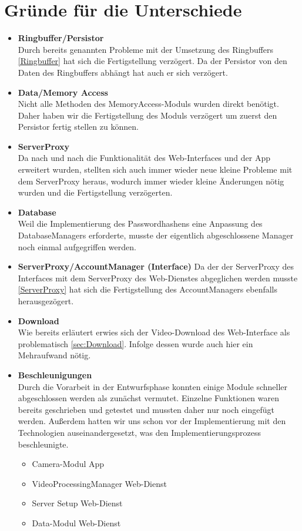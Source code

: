 \section{Gründe für die Unterschiede} \label{sec:PlanDiff}
\begin{itemize}

\item \textbf{Ringbuffer/Persistor} \hfill \\
Durch bereits genannten Probleme mit der Umsetzung des Ringbuffers \eqref{Ringbuffer} hat sich die Fertigstellung verzögert. Da der Persistor von den Daten des Ringbuffers abhängt hat auch er sich verzögert.

\item \textbf{Data/Memory Access} \hfill \\
Nicht alle Methoden des MemoryAccess-Moduls wurden direkt benötigt. Daher haben wir die Fertigstellung des Moduls verzögert um zuerst den Persistor fertig stellen zu können.

\item \label{ServerProxy} \textbf{ServerProxy} \hfill \\
Da nach und nach die Funktionalität des Web-Interfaces und der App erweitert wurden, stellten sich auch immer wieder neue kleine Probleme mit dem ServerProxy heraus, wodurch immer wieder kleine Änderungen nötig wurden und die Fertigstellung verzögerten.

\item \textbf{Database} \hfill \\
Weil die Implementierung des Passwordhashens eine Anpassung des DatabaseManagers erforderte, musste der eigentlich abgeschlossene Manager noch einmal aufgegriffen werden.

\item \textbf{ServerProxy/AccountManager (Interface)}
Da der der ServerProxy des Interfaces mit dem ServerProxy des Web-Dienstes abgeglichen werden musste \eqref{ServerProxy} hat sich die Fertigstellung des AccountManagers ebenfalls herausgezögert.

\item \textbf{Download} \hfill \\
Wie bereits erläutert erwies sich der Video-Download des Web-Interface als problematisch \eqref{sec:Download}. Infolge dessen wurde auch hier ein Mehraufwand nötig.

\item \textbf{Beschleunigungen} \hfill \\
Durch die Vorarbeit in der Entwurfsphase konnten einige Module schneller abgeschlossen werden als zunächst vermutet. Einzelne Funktionen waren bereits geschrieben und getestet und mussten daher nur noch eingefügt werden. Außerdem hatten wir uns schon vor der Implementierung mit den Technologien auseinandergesetzt, was den Implementierungsprozess beschleunigte.
\begin{itemize}
\itemsep0pt
\item Camera-Modul App
\item VideoProcessingManager Web-Dienst
\item Server Setup Web-Dienst
\item Data-Modul Web-Dienst
\end{itemize}
\end{itemize}